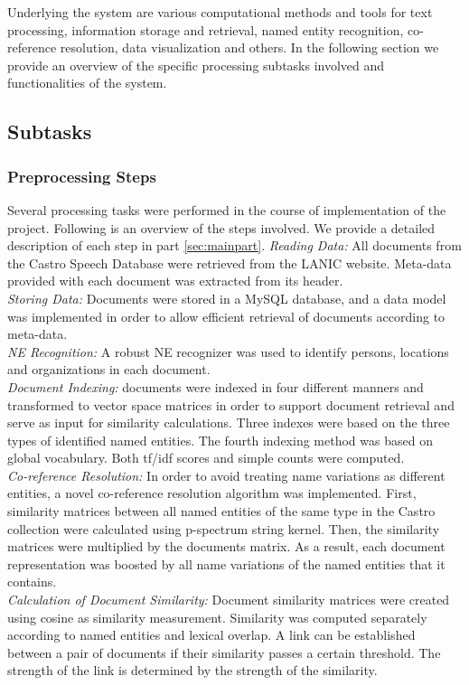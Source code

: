 Underlying the system are various computational methods and tools for text processing, information storage and retrieval, named entity recognition, co-reference resolution, data visualization and others. In the following section we provide an overview of the specific processing subtasks involved and functionalities of the system.

\subsection{Subtasks}
\label{sec:subtasks}
\subsubsection{Preprocessing Steps}
Several processing tasks were performed in the course of implementation of the project. Following is an overview of the steps involved. We provide a  detailed description of each step in part  \ref{sec:mainpart}.
\emph{Reading Data:} All documents from the Castro Speech Database were retrieved from the LANIC website. Meta-data provided with each document was extracted from its header. \\
\emph{Storing Data:} Documents were stored in a MySQL database, and a data model was implemented in order to allow efficient retrieval of documents according to meta-data. \\
\emph{NE Recognition:} A robust NE recognizer was used to identify persons, locations and organizations in each document.\\
\emph{Document Indexing:} documents were indexed in four different manners and transformed to vector space matrices in order to support document retrieval and serve as input for similarity calculations. Three indexes were based on the three types of identified named entities. The fourth indexing method was based on global vocabulary. Both tf/idf scores and simple counts were computed.\\
\emph{Co-reference Resolution:} In order to avoid treating name variations as different entities, a novel co-reference resolution algorithm was implemented. First, similarity matrices between all named entities of the same type in the Castro collection were calculated using p-spectrum string kernel. Then, the similarity matrices were multiplied by the documents matrix. As a result, each document representation was boosted by all name variations of the named entities that it contains.\\
\emph{Calculation of Document Similarity:} Document similarity matrices were created using cosine as similarity measurement. Similarity was computed separately according to named entities and  lexical overlap. A link can be established between a pair of documents if their similarity passes a certain threshold. The strength of the link is determined by the strength of the similarity.

